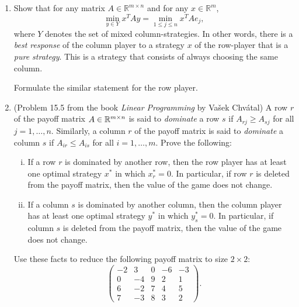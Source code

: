 \documentclass[11pt]{article}
\begin{document}
\begin{enumerate}[1)]
\item Show that for any matrix $A \in \mathbb{R}^{m \times n}$ and for any $x \in \mathbb{R}^m$,
\begin{displaymath}  
\min_{y\in Y} x^TA y = \min_{1≤j≤n } 
x^TAe_j,
\end{displaymath}
where $Y$ denotes the set of mixed column-strategies.
In other words, there is a \emph{best response} of the column player to a strategy $x$ of the row-player that is a \emph{pure strategy}. This is a strategy that consists of always choosing the same column.

Formulate the similar statement for the row player.  \label{ex:br} 

\item (Problem 15.5 from the book \emph{Linear Programming} by  Vašek Chvátal)
A row $r$ of the payoff matrix $A\in \mathbb{R}^{m\times n}$ is said to \emph{dominate} a row $s$ if $A_{rj} ≥ A_{sj}$ for all $j=1,\ldots,n$.
Similarly, a column $r$ of the payoff matrix is said to \emph{dominate} a column $s$ if $A_{ir} ≤ A_{is}$ for all $i=1,\ldots,m$. 
Prove the following:
\begin{enumerate}[(i)]
  \item If a row $r$ is dominated by another row, then the row player has at least one optimal strategy $x^*$ in which $x^*_r = 0$. In particular, if row $r$ is deleted from the payoff matrix, then the value of the game does not change.
  \item If a column $s$ is dominated by another column, then the column player has at least one optimal strategy $y^*$ in which $y^*_s = 0$. In particular, if column $s$ is deleted from the payoff matrix, then the value of the game does not change.
\end{enumerate}
Use these facts to reduce the following payoff matrix to size $2\times 2$:
$$\begin{pmatrix}
  -2 & 3 & 0 & -6 & -3 \\
  0 & -4 & 9 & 2 & 1 \\
  6 & -2 & 7 & 4 & 5 \\
  7 & -3 & 8 & 3 & 2 
\end{pmatrix}.
$$



\end{enumerate}
\end{document}
